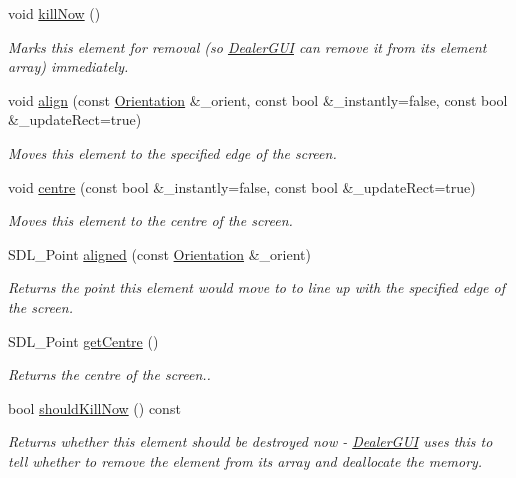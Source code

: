 \begin{DoxyCompactItemize}
void \hyperlink{classGUI_1_1Element_a41c2c102d41148d09980bfc22c591d5a}{kill\-Now} ()
\begin{DoxyCompactList}\small\item\em Marks this element for removal (so \hyperlink{classGUI_1_1DealerGUI}{Dealer\-G\-U\-I} can remove it from its element array) immediately. \end{DoxyCompactList}\item 
void \hyperlink{classGUI_1_1Element_ae66b54c217ca3e5ae724212c2902734c}{align} (const \hyperlink{namespaceGUI_a1a3a8094d47f7be06ce123fab38abf6a}{Orientation} \&\-\_\-orient, const bool \&\-\_\-instantly=false, const bool \&\-\_\-update\-Rect=true)
\begin{DoxyCompactList}\small\item\em Moves this element to the specified edge of the screen. \end{DoxyCompactList}\item 
void \hyperlink{classGUI_1_1Element_a9c65cf73bd7de194324f0e27737ad2aa}{centre} (const bool \&\-\_\-instantly=false, const bool \&\-\_\-update\-Rect=true)
\begin{DoxyCompactList}\small\item\em Moves this element to the centre of the screen. \end{DoxyCompactList}\item 
S\-D\-L\-\_\-\-Point \hyperlink{classGUI_1_1Element_a356e0d191ac5fb0c8862ed7061b4afd8}{aligned} (const \hyperlink{namespaceGUI_a1a3a8094d47f7be06ce123fab38abf6a}{Orientation} \&\-\_\-orient)
\begin{DoxyCompactList}\small\item\em Returns the point this element would move to to line up with the specified edge of the screen. \end{DoxyCompactList}\item 
S\-D\-L\-\_\-\-Point \hyperlink{classGUI_1_1Element_ac63b5aa7f11dd212514e6225fe7e3b0b}{get\-Centre} ()
\begin{DoxyCompactList}\small\item\em Returns the centre of the screen.. \end{DoxyCompactList}\item 
bool \hyperlink{classGUI_1_1Element_a70bb69d6bfe2546a05be445a758344af}{should\-Kill\-Now} () const 
\begin{DoxyCompactList}\small\item\em Returns whether this element should be destroyed now -\/ \hyperlink{classGUI_1_1DealerGUI}{Dealer\-G\-U\-I} uses this to tell whether to remove the element from its array and deallocate the memory. \end{DoxyCompactList}\item 

\end{DoxyCompactItemize}
